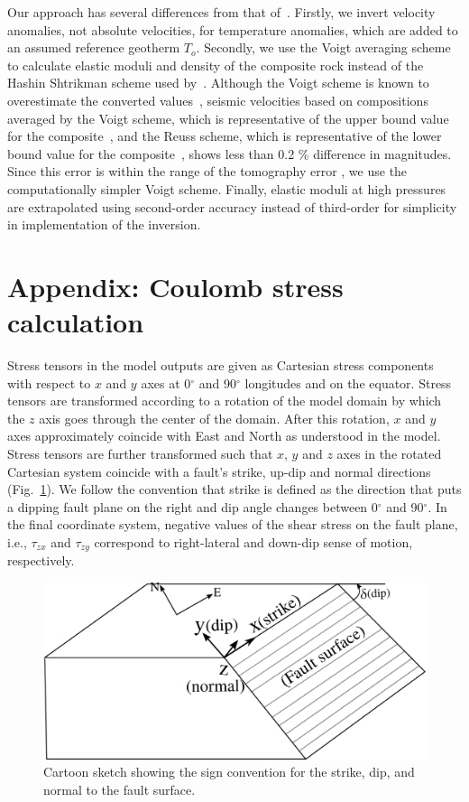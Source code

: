 \documentclass[draft,linenumbers]{agujournal2018}
\begin{document}
Our approach has several differences from that of~\citet{Cammarano2003}. Firstly, we invert velocity anomalies, not absolute velocities, for temperature anomalies, which are added to an assumed reference geotherm $T_o$. Secondly, we use the Voigt averaging scheme to calculate elastic moduli and density of the composite rock instead of the Hashin Shtrikman scheme used by~\citet{Cammarano2003}. Although the Voigt scheme is known to overestimate the converted values~\citep{watt_1976}, seismic velocities based on compositions averaged by the Voigt scheme, which is representative of the upper bound value for the composite~\citep{watt_1976}, and the Reuss scheme, which is representative of the  lower bound value for the composite~\citep{watt_1976}, shows less than 0.2 \% difference in magnitudes. Since this error is within the range of the tomography error \citep{Biryol_2016}, we use the computationally simpler Voigt scheme. Finally, elastic moduli at high pressures are extrapolated using second-order accuracy instead of third-order for simplicity in implementation of the inversion.

\section{Appendix: Coulomb stress calculation}

Stress tensors in the model outputs are given as Cartesian stress components with respect to $x$ and $y$ axes at 0$^{\circ}$ and 90$^{\circ}$ longitudes and on the equator. Stress tensors are transformed according to a rotation of the model domain by which the $z$ axis goes through the center of the domain. After this rotation, $x$ and $y$ axes approximately coincide with East and North as understood in the model. Stress tensors are further transformed such that $x$, $y$ and $z$ axes in the rotated Cartesian system coincide with a fault\rq{}s strike, up-dip and normal directions (Fig.~\ref{signs}). We follow the convention that strike is defined as the direction that puts a dipping fault plane on the right and dip angle changes between 0$^{\circ}$ and 90$^{\circ}$. %
In the final coordinate system, negative values of the shear stress on the fault plane, i.e., $\tau_{zx}$ and $\tau_{zy}$ correspond to right-lateral and down-dip sense of motion, respectively.

%
\begin{figure}[h!]
    \centering
    \includegraphics[width=0.5\linewidth]{figures/sign_convention.png}
    \caption{Cartoon sketch showing the sign convention for the strike, dip, and normal to the fault surface. }
    \label{signs}
\end{figure}
\end{document}
